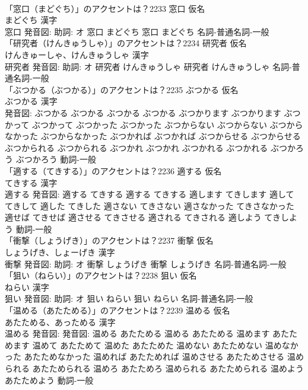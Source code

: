 \documentclass[8pt]{extreport}
\begin{document}
\begin{CJK}{UTF8}{min}
\\	「窓口（まどぐち）」のアクセントは？2233	窓口 仮名　
\\	まどぐち 漢字　
\\	窓口 発音図: 助詞: オ	窓口 まどぐち		窓口 まどぐち				名詞-普通名詞-一般 
\\	「研究者（けんきゅうしゃ）」のアクセントは？2234	研究者 仮名　
\\	けんきゅーしゃ、けんきゅうしゃ 漢字　
\\	研究者 発音図: 助詞: オ	研究者 けんきゅうしゃ		研究者 けんきゅうしゃ				名詞-普通名詞-一般 
\\	「ぶつかる（ぶつかる）」のアクセントは？2235	ぶつかる 仮名　
\\	ぶつかる 漢字　
\\	発音図:	ぶつかる ぶつかる		ぶつかる ぶつかる ぶつかります ぶつかります ぶつかって ぶつかって ぶつかった ぶつかった ぶつからない ぶつからない ぶつからなかった ぶつからなかった ぶつかれば ぶつかれば ぶつからせる ぶつからせる ぶつかられる ぶつかられる ぶつかれ ぶつかれ ぶつかれる ぶつかれる ぶつかろう ぶつかろう				動詞-一般 
\\	「適する（てきする）」のアクセントは？2236	適する 仮名　
\\	てきする 漢字　
\\	適する 発音図:	適する てきする		適する てきする 適します てきします 適して てきして 適した てきした 適さない てきさない 適さなかった てきさなかった 適せば てきせば 適させる てきさせる 適される てきされる 適しよう てきしよう				動詞-一般 
\\	「衝撃（しょうげき）」のアクセントは？2237	衝撃 仮名　
\\	しょうげき、しょーげき 漢字　
\\	衝撃 発音図: 助詞: オ	衝撃 しょうげき		衝撃 しょうげき				名詞-普通名詞-一般 
\\	「狙い（ねらい）」のアクセントは？2238	狙い 仮名　
\\	ねらい 漢字　
\\	狙い 発音図: 助詞: オ	狙い ねらい		狙い ねらい				名詞-普通名詞-一般 
\\	「温める（あたためる）」のアクセントは？2239	温める 仮名　
\\	あたためる、あっためる 漢字　
\\	温める 発音図: 発音図:	温める あたためる		温める あたためる 温めます あたためます 温めて あたためて 温めた あたためた 温めない あたためない 温めなかった あたためなかった 温めれば あたためれば 温めさせる あたためさせる 温められる あたためられる 温めろ あたためろ 温められる あたためられる 温めよう あたためよう				動詞-一般 

\end{CJK}
\end{document}
